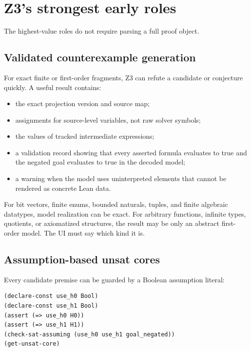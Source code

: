 \documentclass[11pt,letterpaper,openany]{report}
\begin{document}
\section{Z3's strongest early roles}

The highest-value roles do not require parsing a full proof object.

\subsection{Validated counterexample generation}

For exact finite or first-order fragments, Z3 can refute a candidate or conjecture
quickly. A useful result contains:

\begin{itemize}
  \item the exact projection version and source map;
  \item assignments for source-level variables, not raw solver symbols;
  \item the values of tracked intermediate expressions;
  \item a validation record showing that every asserted formula evaluates to true and
        the negated goal evaluates to true in the decoded model;
  \item a warning when the model uses uninterpreted elements that cannot be rendered as
        concrete Lean data.
\end{itemize}

For bit vectors, finite enums, bounded naturals, tuples, and finite algebraic
datatypes, model realization can be exact. For arbitrary functions, infinite types,
quotients, or axiomatized structures, the result may be only an abstract first-order
model. The UI must say which kind it is.

\subsection{Assumption-based unsat cores}

Every candidate premise can be guarded by a Boolean assumption literal:

\begin{lstlisting}[language=SMTLIB,caption={Schematic tracked-premise encoding}]
(declare-const use_h0 Bool)
(declare-const use_h1 Bool)
(assert (=> use_h0 H0))
(assert (=> use_h1 H1))
(check-sat-assuming (use_h0 use_h1 goal_negated))
(get-unsat-core)
\end{lstlisting}
\end{document}
